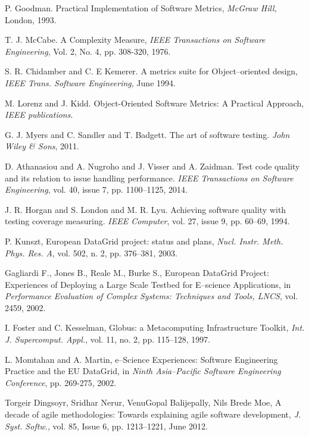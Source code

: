 \documentclass[journal]{IEEEtran}
\begin{document}
\begin{thebibliography}{1}
P. Goodman.
Practical Implementation of Software Metrics, 
\emph{McGraw Hill}, London, 1993.


T. J. McCabe.
A   Complexity   Measure,
\emph{IEEE   Transactions   on   Software Engineering},
Vol. 2, No. 4, pp. 308-320, 1976.

S.  R.  Chidamber  and  C.  E  Kemerer.
A  metrics  suite  for  Object--oriented  design,
\emph{IEEE Trans. Software Engineering}, 
June 1994.

M. Lorenz and J. Kidd.
Object-Oriented Software Metrics: A Practical Approach,
\emph{IEEE publications}.

G. J. Myers and C. Sandler and T. Badgett.
The art of software testing.
\emph{John Wiley \& Sons}, 2011.



D. Athanasiou and A. Nugroho and J. Visser and A. Zaidman.
Test code quality and its relation to issue handling performance.
\emph{IEEE Transactions on Software Engineering}, 
vol. 40, issue 7, pp. 1100--1125, 2014.



J. R. Horgan and S. London and M. R. Lyu.
Achieving software quality with testing coverage measuring.
\emph{IEEE Computer},
vol. 27, issue 9, pp. 60--69, 1994.



P. Kunszt,
European DataGrid project: status and plans,
\emph{Nucl. Instr. Meth. Phys. Res. A},
vol. 502, n. 2, pp. 376--381, 2003.

Gagliardi F., Jones B., Reale M., Burke S.,
European DataGrid Project: Experiences of Deploying a Large Scale Testbed for E--science Applications,
in \emph{Performance Evaluation of Complex Systems: Techniques and Tools, LNCS},
vol. 2459, 2002.

I. Foster and C. Kesselman,
Globus: a Metacomputing Infrastructure Toolkit,
\emph{Int. J. Supercomput. Appl.},
vol. 11, no. 2, pp. 115--128, 1997.

L. Momtahan and A. Martin,
e--Science Experiences: Software Engineering Practice and the EU DataGrid,
in \emph{Ninth Asia--Pacific Software Engineering Conference},
pp. 269-275, 2002.

Torgeir Dingsoyr, Sridhar Nerur, VenuGopal Balijepally, Nils Brede Moe,
A decade of agile methodologies: Towards explaining agile software development,
\emph{J. Syst. Softw.},
vol. 85, Issue 6, pp. 1213--1221, June 2012.


\end{thebibliography}
\end{document}
